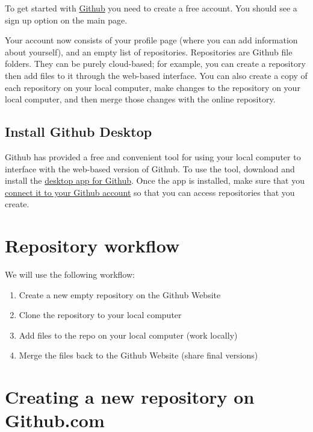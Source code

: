 \documentclass[
]{book}
\providecommand{\tightlist}{%
  \setlength{\itemsep}{0pt}\setlength{\parskip}{0pt}}
\begin{document}
To get started with \href{https://github.com}{Github} you need to create a free account. You should see a sign up option on the main page.

Your account now consists of your profile page (where you can add information about yourself), and an empty list of repositories. Repositories are Github file folders. They can be purely cloud-based; for example, you can create a repository then add files to it through the web-based interface. You can also create a copy of each repository on your local computer, make changes to the repository on your local computer, and then merge those changes with the online repository.

\hypertarget{install-github-desktop}{%
\subsection{Install Github Desktop}\label{install-github-desktop}}

Github has provided a free and convenient tool for using your local computer to interface with the web-based version of Github. To use the tool, download and install the \href{https://desktop.github.com}{desktop app for Github}. Once the app is installed, make sure that you \href{https://help.github.com/desktop/guides/getting-started-with-github-desktop/authenticating-to-github/}{connect it to your Github account} so that you can access repositories that you create.

\hypertarget{repository-workflow}{%
\section{Repository workflow}\label{repository-workflow}}

We will use the following workflow:

\begin{enumerate}
\def\labelenumi{\arabic{enumi}.}
\tightlist
\item
  Create a new empty repository on the Github Website
\item
  Clone the repository to your local computer
\item
  Add files to the repo on your local computer (work locally)
\item
  Merge the files back to the Github Website (share final versions)
\end{enumerate}

\hypertarget{creating-a-new-repository-on-github.com}{%
\section{Creating a new repository on Github.com}\label{creating-a-new-repository-on-github.com}}
\end{document}

